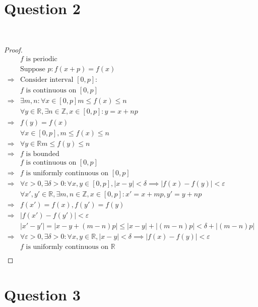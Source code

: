 \documentclass{article}
\begin{document}
\newpage

\section*{Question 2}

~

\begin{proof}
    \begin{align*}
        &f\text{ is periodic}\\
        &\text{Suppose }p:f(x+p)=f(x)\\
        \Rightarrow&\text{Consider interval }[0,p]:\\
        &f\text{ is continuous on }[0,p]\\
        \Rightarrow&\exists m,n:\forall x\in [0,p]m\leqslant f(x)\leqslant n\\
        &\forall y\in \mathbb{R},\exists n\in\mathbb{Z},x\in[0,p]:y=x+np\\
        \Rightarrow&f(y)=f(x)\\
        &\forall x\in [0,p],m\leqslant f(x)\leqslant n\\
        \Rightarrow&\forall y\in \mathbb{R}m\leqslant f(y)\leqslant n\\
        \Rightarrow&f\text{ is bounded}\\
        &f\text{ is continuous on }[0,p]\\
        \Rightarrow&f\text{ is uniformly continuous on }[0,p]\\
        \Rightarrow&\forall \varepsilon >0,\exists \delta>0:\forall x,y\in [0,p],|x-y|<\delta\implies |f(x)-f(y)|<\varepsilon\\
        &\forall x',y'\in \mathbb{R},\exists m,n\in\mathbb{Z},x\in[0,p]:x'=x+mp,y'=y+np\\
        \Rightarrow&f(x')=f(x),f(y')=f(y)\\
        \Rightarrow&|f(x')-f(y')|<\varepsilon\\
        &|x'-y'|=|x-y+(m-n)p|\leqslant |x-y|+|(m-n)p|<\delta+|(m-n)p|\\
        \Rightarrow&\forall \varepsilon >0,\exists \delta>0:\forall x,y\in \mathbb{R},|x-y|<\delta\implies |f(x)-f(y)|<\varepsilon\\
        &f\text{ is uniformly continuous on }\mathbb{R}\\
    \end{align*}
\end{proof}

\newpage

\section*{Question 3}
\end{document}
